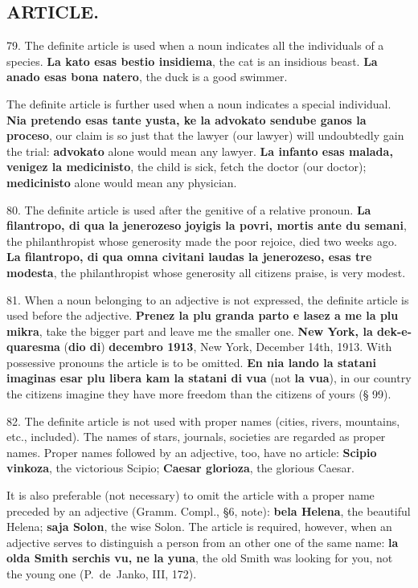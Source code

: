 \subsection*{ARTICLE.}
79. The definite article is used when a noun indicates all the individuals of a species. \textbf{La kato esas bestio insidiema}, the cat is an insidious beast. \textbf{La anado esas bona natero}, the duck is a good swimmer. 

The definite article is further used when a noun indicates a special individual. \textbf{Nia pretendo esas tante yusta, ke la advokato sendube ganos la proceso}, our claim is so just that the lawyer (our lawyer) will undoubtedly gain the trial: \textbf{advokato} alone would mean any lawyer. \textbf{La infanto esas malada, venigez la medicinisto}, the child is sick, fetch the doctor (our doctor); \textbf{medicinisto} alone would mean any physician. 

80. The definite article is used after the genitive of a relative pronoun. \textbf{La filantropo, di qua la jenerozeso joyigis la povri, mortis ante du semani}, the philanthropist whose generosity made the poor rejoice, died two weeks ago. \textbf{La filantropo, di qua omna civitani laudas la jenerozeso, esas tre modesta}, the philanthropist whose generosity all citizens praise, is very modest. 

81. When a noun belonging to an adjective is not expressed, the definite article is used before the adjective. \textbf{Prenez la plu granda parto e lasez a me la plu mikra}, take the bigger part and leave me the smaller one. \textbf{New York, la dek-e-quaresma} (\textbf{dio di}) \textbf{decembro 1913}, New York, December 14th, 1913. With possessive pronouns the article is to be omitted. \textbf{En nia lando la statani imaginas esar plu libera kam la statani di vua} (not \textbf{la vua}), in our country the citizens imagine they have more freedom than the citizens of yours (§ 99). 

82. The definite article is not used with proper names (cities, rivers, mountains, etc., included). The names of stars, journals, societies are regarded as proper names. Proper names followed by an adjective, too, have no article: \textbf{Scipio vinkoza}, the victorious Scipio; \textbf{Caesar glorioza}, the glorious Caesar. 

It is also preferable (not necessary) to omit the article with a proper name preceded by an adjective (Gramm. Compl., §6, note): \textbf{bela Helena}, the beautiful Helena; \textbf{saja Solon}, the wise Solon. The article is required, however, when an adjective serves to distinguish a person from an other one of the same name: \textbf{la olda Smith serchis vu, ne la yuna}, the old Smith was looking for you, not the young one (P.~de~Janko, III, 172). 


